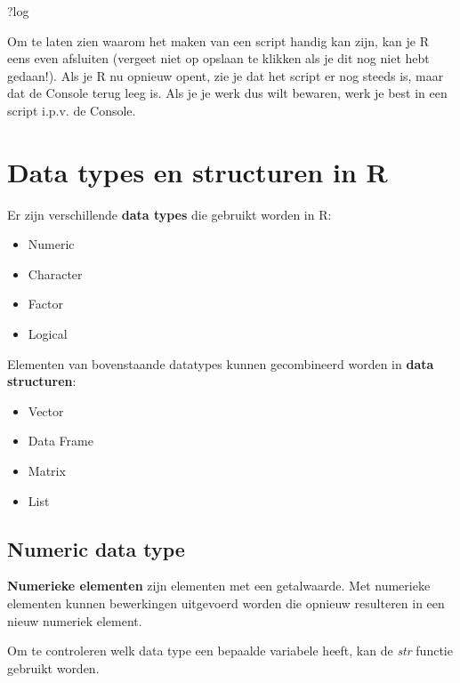 \documentclass[
]{book}
\newenvironment{Shaded}{\begin{snugshade}}{\end{snugshade}}
\newcommand{\NormalTok}[1]{#1}
\providecommand{\tightlist}{%
  \setlength{\itemsep}{0pt}\setlength{\parskip}{0pt}}
\begin{document}
\begin{Shaded}
\begin{Highlighting}[]
\NormalTok{?log}
\end{Highlighting}
\end{Shaded}

Om te laten zien waarom het maken van een script handig kan zijn, kan je R eens even afsluiten (vergeet niet op opslaan te klikken als je dit nog niet hebt gedaan!). Als je R nu opnieuw opent, zie je dat het script er nog steeds is, maar dat de Console terug leeg is. Als je je werk dus wilt bewaren, werk je best in een script i.p.v. de Console.

\hypertarget{data-types-en-structuren-in-r}{%
\chapter{Data types en structuren in R}\label{data-types-en-structuren-in-r}}

Er zijn verschillende \textbf{data types} die gebruikt worden in R:

\begin{itemize}
\tightlist
\item
  Numeric
\item
  Character
\item
  Factor
\item
  Logical
\end{itemize}

Elementen van bovenstaande datatypes kunnen gecombineerd worden in \textbf{data structuren}:

\begin{itemize}
\tightlist
\item
  Vector
\item
  Data Frame
\item
  Matrix
\item
  List
\end{itemize}

\hypertarget{numeric-data-type}{%
\section{Numeric data type}\label{numeric-data-type}}

\textbf{Numerieke elementen} zijn elementen met een getalwaarde. Met numerieke elementen kunnen bewerkingen uitgevoerd worden die opnieuw resulteren in een nieuw numeriek element.

Om te controleren welk data type een bepaalde variabele heeft, kan de \emph{str} functie
gebruikt worden.
\end{document}
